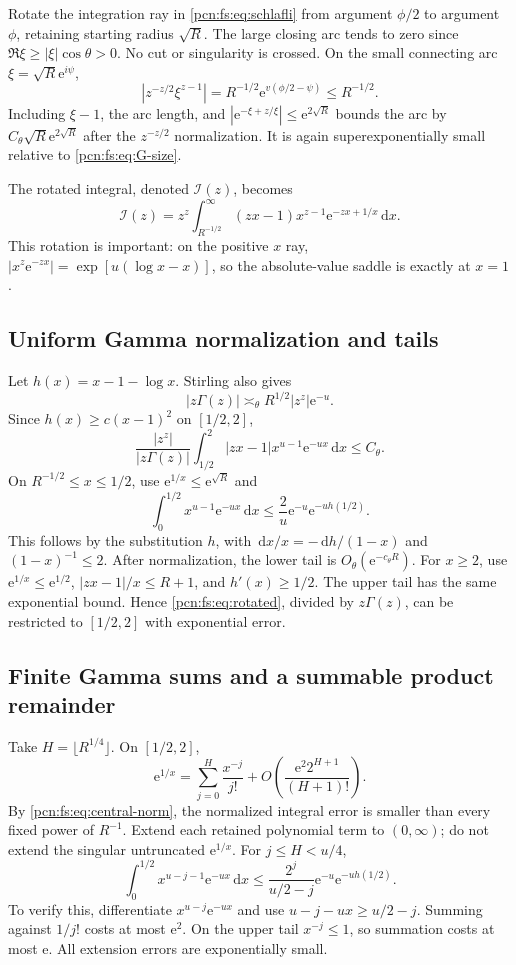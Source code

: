 \documentclass[11pt,letterpaper]{article}
\theoremstyle{remark}\newtheorem{remark}[theorem]{Remark}
\newcommand{\dd}{\,\mathrm d}
\newcommand{\ee}{\mathrm e}
\begin{document}
Rotate the integration ray in \eqref{pcn:fs:eq:schlafli} from argument $\phi/2$ to argument $\phi$, retaining starting radius $\sqrt R$. The large closing arc tends to zero since $\Re\xi\ge|\xi|\cos\theta>0$. No cut or singularity is crossed. On the small connecting arc $\xi=\sqrt R\ee^{i\psi}$,
\[
 |z^{-z/2}\xi^{z-1}|=R^{-1/2}\ee^{v(\phi/2-\psi)}
                         \le R^{-1/2}.
\]
Including $\xi-1$, the arc length, and $|\ee^{-\xi+z/\xi}|\le\ee^{2\sqrt R}$ bounds the arc by $C_\theta\sqrt R\ee^{2\sqrt R}$ after the $z^{-z/2}$ normalization. It is again superexponentially small relative to \eqref{pcn:fs:eq:G-size}.

The rotated integral, denoted $\mathcal I(z)$, becomes
\begin{equation}\label{pcn:fs:eq:rotated}
 \mathcal I(z)=z^z\int_{R^{-1/2}}^\infty
                 (zx-1)x^{z-1}\ee^{-zx+1/x}\dd x.
\end{equation}
This rotation is important: on the positive $x$ ray,
$|x^z\ee^{-zx}|=\exp[u(\log x-x)]$, so the absolute-value saddle is exactly at $x=1$.

\subsection{Uniform Gamma normalization and tails}
Let $h(x)=x-1-\log x$. Stirling also gives
\[
 |z\Gamma(z)|\asymp_\theta R^{1/2}|z^z|\ee^{-u}.
\]
Since $h(x)\ge c(x-1)^2$ on $[1/2,2]$,
\begin{equation}\label{pcn:fs:eq:central-norm}
 \frac{|z^z|}{|z\Gamma(z)|}
       \int_{1/2}^2|zx-1|x^{u-1}\ee^{-ux}\dd x\le C_\theta.
\end{equation}
On $R^{-1/2}\le x\le1/2$, use $\ee^{1/x}\le\ee^{\sqrt R}$ and
\[
 \int_0^{1/2}x^{u-1}\ee^{-ux}\dd x
       \le\frac2u\ee^{-u}\ee^{-u h(1/2)}.
\]
This follows by the substitution $h$, with
$\dd x/x=-\dd h/(1-x)$ and $(1-x)^{-1}\le2$. After normalization, the lower tail is $O_\theta(\ee^{-c_\theta R})$.
For $x\ge2$, use $\ee^{1/x}\le\ee^{1/2}$, $|zx-1|/x\le R+1$, and $h'(x)\ge1/2$. The upper tail has the same exponential bound. Hence \eqref{pcn:fs:eq:rotated}, divided by $z\Gamma(z)$, can be restricted to $[1/2,2]$ with exponential error.

\subsection{Finite Gamma sums and a summable product remainder}
Take $H=\lfloor R^{1/4}\rfloor$. On $[1/2,2]$,
\[
 \ee^{1/x}=\sum_{j=0}^H\frac{x^{-j}}{j!}
             +O\left(\frac{\ee^2 2^{H+1}}{(H+1)!}\right).
\]
By \eqref{pcn:fs:eq:central-norm}, the normalized integral error is smaller than every fixed power of $R^{-1}$. Extend each retained polynomial term to $(0,\infty)$; do not extend the singular untruncated $\ee^{1/x}$. For $j\le H<u/4$,
\[
 \int_0^{1/2}x^{u-j-1}\ee^{-ux}\dd x
 \le\frac{2^j}{u/2-j}\ee^{-u}\ee^{-u h(1/2)}.
\]
To verify this, differentiate $x^{u-j}\ee^{-ux}$ and use
$u-j-ux\ge u/2-j$. Summing against $1/j!$ costs at most $\ee^2$. On the upper tail $x^{-j}\le1$, so summation costs at most $\ee$. All extension errors are exponentially small.
\end{document}
